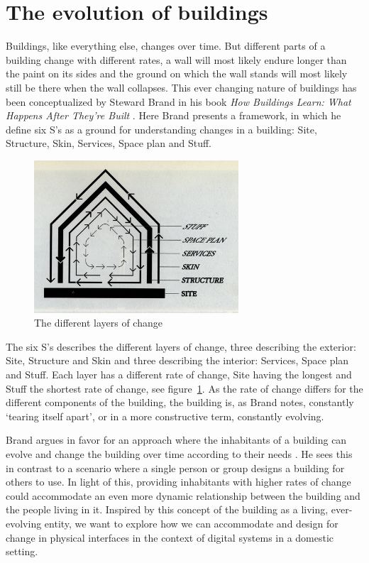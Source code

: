 \section{The evolution of buildings}
Buildings, like everything else, changes over time.
But different parts of a building change with different rates, a wall will most likely endure longer than the paint on its sides and the ground on which the wall stands will most likely still be there when the wall collapses.
This ever changing nature of buildings has been conceptualized by Steward Brand in his book \emph{How Buildings Learn: What Happens After They're Built} \citep{brand1995buildings}.
Here Brand presents a framework, in which he define six S's as a ground for understanding changes in a building: Site, Structure, Skin, Services, Space plan and Stuff.

\begin{figure}[hb]
	\centering
  		\includegraphics[width=3in]{figures/brand-diagram}
	\caption[The different layers of change, taken from \cite{brand1995buildings}]
   {The different layers of change \cite{brand1995buildings}}
   \label{brand-diagram}
\end{figure}

The six S's describes the different layers of change, three describing the exterior: Site, Structure and Skin and three describing the interior: Services, Space plan and Stuff.
Each layer has a different rate of change, Site having the longest and Stuff the shortest rate of change, see figure~\ref{brand-diagram}. As the rate of change differs for the different components of the building, the building is, as Brand notes, constantly `tearing itself apart', or in a more constructive term, constantly evolving.

Brand argues in favor for an approach where the inhabitants of a building can evolve and change the building over time according to their needs \citep{brandBBCvideo}.
He sees this in contrast to a scenario where a single person or group designs a building for others to use.
In light of this, providing inhabitants with higher rates of change could accommodate an even more dynamic relationship between the building and the people living in it.
Inspired by this concept of the building as a living, ever-evolving entity, we want to explore how we can accommodate and design for change in physical interfaces in the context of digital systems in a domestic setting.

